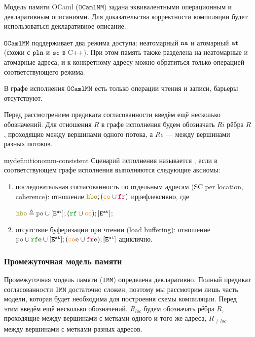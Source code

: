 \documentclass[14pt]{matmex-diploma-custom}
\newcommand{\IMM}{\mathtt{IMM}}
\newcommand{\OMM}{\mathtt{OCaml}\allowbreak \mathtt{MM}}
\begin{document}
Модель памяти OCaml ($\OMM$) \cite{omm} задана эквивалентными операционным и декларативным описаниями. Для доказательства корректности компиляции будет использоваться декларативное описание.

$\OMM$ поддерживает два режима доступа: неатомарный ${\mathtt{na}}$ и атомарный ${\mathtt{at}}$ (схожи с $\mathtt{pln}$ и ${\mathtt{sc}}$ в C++). При этом память также разделена на неатомарные и атомарные адреса, и к конкретному адресу можно обратиться только операцией соответствующего режима.

В графе исполнения $\OMM$ есть только операции чтения и записи, барьеры отсутствуют.

Перед рассмотрением предиката согласованности введём ещё несколько обозначений. Для отношения $R$ в графе исполнения будем обозначать $Ri$ рёбра $R$, проходящие между вершинами одного потока, а $Re$ --- между вершинами разных потоков. 

\begin{restatable}{mydefinition}{omm-consistent}
  Сценарий исполнения называется \term{согласованным по $\OMM$}, если в соответствующем графе исполнения выполняются следующие аксиомы:

  \begin{enumerate}
  \item последовательная согласованность по отдельным адресам (SC per location, coherence): отношение $\lHBO ; (\lCO \cup \lFR)$ иррефлексивно, где

    $\lHBO \defeq \lPO \cup [\lE^{\at}] ; (\lRF \cup \lCO) ; [\lE^{\at}]$;
    
  \item отсутствие буферизации при чтении (load buffering): отношение $\lPO \cup \lRFE \cup [\lE^{\at}] ; (\lCOE \cup \lFRE) ; [\lE^{\at}]$ ациклично.
  \end{enumerate}
\end{restatable}

\subsubsection{Промежуточная модель памяти}

Промежуточная модель памяти ($\IMM$) определена декларативно. Полный предикат согласованности $\IMM$ достаточно сложен, поэтому мы рассмотрим лишь часть модели, которая будет необходима для построения схемы компиляции. Перед этим введём ещё несколько обозначений. $R_{loc}$ будем обозначать рёбра $R$, проходящие между вершинами с метками одного и того же адреса, $R_{\neq loc}$ --- между вершинами с метками разных адресов.
\end{document}
